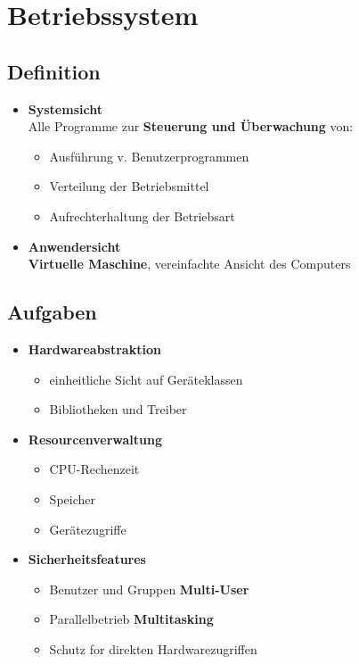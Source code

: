 \section{Betriebssystem}

\subsection{Definition}

\begin{itemize}
    \item \textbf{Systemsicht} \\
        Alle Programme zur \textbf{Steuerung und Überwachung} von:
        \begin{itemize}
            \item Ausführung v. Benutzerprogrammen
            \item Verteilung der Betriebsmittel
            \item Aufrechterhaltung der Betriebsart
        \end{itemize}
    \item \textbf{Anwendersicht} \\
        \textbf{Virtuelle Maschine}, vereinfachte Ansicht des Computers
\end{itemize}

\subsection{Aufgaben}

\begin{itemize}
    \item \textbf{Hardwareabstraktion}
    \begin{itemize}
        \item einheitliche Sicht auf Geräteklassen
        \item Bibliotheken und Treiber
    \end{itemize}

    \item \textbf{Resourcenverwaltung}
    \begin{itemize}
        \item CPU-Rechenzeit
        \item Speicher
        \item Gerätezugriffe
    \end{itemize}

    \item \textbf{Sicherheitsfeatures}
    \begin{itemize}
        \item Benutzer und Gruppen \textbf{Multi-User}
        \item Parallelbetrieb \textbf{Multitasking}
        \item Schutz for direkten Hardwarezugriffen
    \end{itemize}
\end{itemize}

